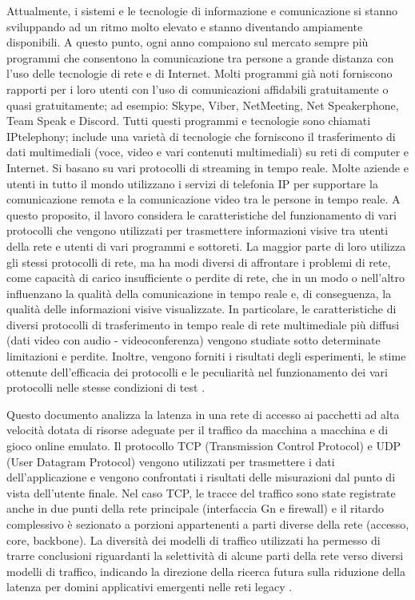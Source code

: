 Attualmente, i sistemi e le tecnologie di informazione e comunicazione si stanno sviluppando ad un ritmo molto elevato e stanno diventando ampiamente disponibili. A questo punto, ogni anno compaiono sul mercato sempre più programmi che consentono la comunicazione tra persone a grande distanza con l'uso delle tecnologie di rete e di Internet. Molti programmi già noti forniscono rapporti per i loro utenti con l'uso di comunicazioni affidabili gratuitamente o quasi gratuitamente; ad esempio: Skype, Viber, NetMeeting, Net Speakerphone, Team Speak e Discord. Tutti questi programmi e tecnologie sono chiamati IPtelephony; include una varietà di tecnologie che forniscono il trasferimento di dati multimediali (voce, video e vari contenuti multimediali) su reti di computer e Internet. Si basano su vari protocolli di streaming in tempo reale. Molte aziende e utenti in tutto il mondo utilizzano i servizi di telefonia IP per supportare la comunicazione remota e la comunicazione video tra le persone in tempo reale. A questo proposito, il lavoro considera le caratteristiche del funzionamento di vari protocolli che vengono utilizzati per trasmettere informazioni visive tra utenti della rete e utenti di vari programmi e sottoreti. La maggior parte di loro utilizza gli stessi protocolli di rete, ma ha modi diversi di affrontare i problemi di rete, come capacità di carico insufficiente o perdite di rete, che in un modo o nell'altro influenzano la qualità della comunicazione in tempo reale e, di conseguenza, la qualità delle informazioni visive visualizzate. In particolare, le caratteristiche di diversi protocolli di trasferimento in tempo reale di rete multimediale più diffusi (dati video con audio - videoconferenza) vengono studiate sotto determinate limitazioni e perdite. Inoltre, vengono forniti i risultati degli esperimenti, le stime ottenute dell'efficacia dei protocolli e le peculiarità nel funzionamento dei vari protocolli nelle stesse condizioni di test \parencite{Network_technology_for_transmission_of_visual_information}.

Questo documento analizza la latenza in una rete di accesso ai pacchetti ad alta velocità dotata di risorse adeguate per il traffico da macchina a macchina e di gioco online emulato. Il protocollo TCP (Transmission Control Protocol) e UDP (User Datagram Protocol) vengono utilizzati per trasmettere i dati dell'applicazione e vengono confrontati i risultati delle misurazioni dal punto di vista dell'utente finale. Nel caso TCP, le tracce del traffico sono state registrate anche in due punti della rete principale (interfaccia Gn e firewall) e il ritardo complessivo è sezionato a porzioni appartenenti a parti diverse della rete (accesso, core, backbone). La diversità dei modelli di traffico utilizzati ha permesso di trarre conclusioni riguardanti la selettività di alcune parti della rete verso diversi modelli di traffico, indicando la direzione della ricerca futura sulla riduzione della latenza per domini applicativi emergenti nelle reti legacy \parencite{Latency_analysis_for_M2M}.



